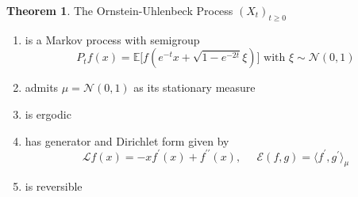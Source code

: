 \documentclass{article}
\theoremstyle{definition}
\newtheorem{theorem}{Theorem}[section]
\theoremstyle{remark}
\theoremstyle{definition}
\begin{document}
  \begin{theorem}
  The Ornstein-Uhlenbeck Process $(X_t)_{t \geq 0}$ 
  \begin{enumerate}
      \item is a Markov process with semigroup 
      \[P_t f(x) = \mathbb{E} \big[ f(e^{-t} x + \sqrt{1 - e^{-2t}} \xi) \big] \text{ with } \xi \sim \mathcal{N}(0, 1)\]
      \item admits $\mu = \mathcal{N}(0, 1)$ as its stationary measure
      \item is ergodic
      \item has generator and Dirichlet form given by 
      \[\mathscr{L} f(x) = -x f^{\prime} (x) + f^{\prime\prime} (x), \;\;\;\;\; \mathcal{E}(f, g) = \langle f^\prime , g^\prime \rangle_\mu\]
      \item is reversible
  \end{enumerate}
  \end{theorem}
\end{document}
